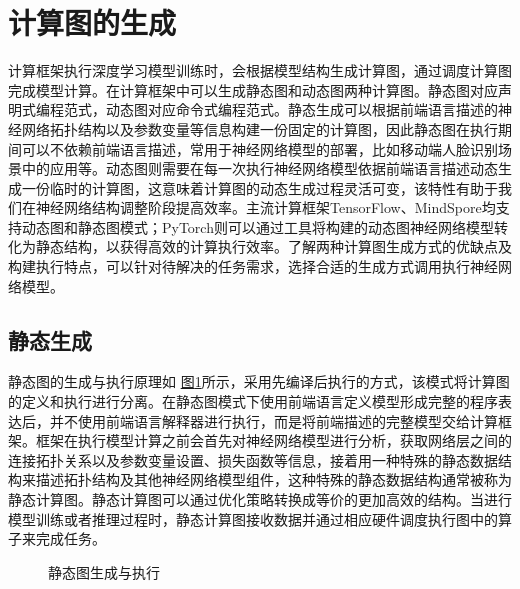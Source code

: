 \documentclass[letterpaper,10pt,english]{sphinxmanual}
\let\sphinxpxdimen\pdfpxdimen\else\newdimen\sphinxpxdimen
\begin{document}
\section{计算图的生成}
\label{\detokenize{chapter_computational_graph/generation_of_computational_graph:id1}}\label{\detokenize{chapter_computational_graph/generation_of_computational_graph::doc}}
\sphinxAtStartPar
计算框架执行深度学习模型训练时，会根据模型结构生成计算图，通过调度计算图完成模型计算。在计算框架中可以生成静态图和动态图两种计算图。静态图对应声明式编程范式，动态图对应命令式编程范式。静态生成可以根据前端语言描述的神经网络拓扑结构以及参数变量等信息构建一份固定的计算图，因此静态图在执行期间可以不依赖前端语言描述，常用于神经网络模型的部署，比如移动端人脸识别场景中的应用等。动态图则需要在每一次执行神经网络模型依据前端语言描述动态生成一份临时的计算图，这意味着计算图的动态生成过程灵活可变，该特性有助于我们在神经网络结构调整阶段提高效率。主流计算框架TensorFlow、MindSpore均支持动态图和静态图模式；PyTorch则可以通过工具将构建的动态图神经网络模型转化为静态结构，以获得高效的计算执行效率。了解两种计算图生成方式的优缺点及构建执行特点，可以针对待解决的任务需求，选择合适的生成方式调用执行神经网络模型。


\subsection{静态生成}
\label{\detokenize{chapter_computational_graph/generation_of_computational_graph:id2}}
\sphinxAtStartPar
静态图的生成与执行原理如
\hyperref[\detokenize{chapter_computational_graph/generation_of_computational_graph:static}]{图\ref{\detokenize{chapter_computational_graph/generation_of_computational_graph:static}}}所示，采用先编译后执行的方式，该模式将计算图的定义和执行进行分离。在静态图模式下使用前端语言定义模型形成完整的程序表达后，并不使用前端语言解释器进行执行，而是将前端描述的完整模型交给计算框架。框架在执行模型计算之前会首先对神经网络模型进行分析，获取网络层之间的连接拓扑关系以及参数变量设置、损失函数等信息，接着用一种特殊的静态数据结构来描述拓扑结构及其他神经网络模型组件，这种特殊的静态数据结构通常被称为静态计算图。静态计算图可以通过优化策略转换成等价的更加高效的结构。当进行模型训练或者推理过程时，静态计算图接收数据并通过相应硬件调度执行图中的算子来完成任务。

\begin{figure}[H]
\centering
\capstart

\noindent\sphinxincludegraphics[width=800\sphinxpxdimen]{{static}.svg}
\caption{静态图生成与执行}\label{\detokenize{chapter_computational_graph/generation_of_computational_graph:id6}}\label{\detokenize{chapter_computational_graph/generation_of_computational_graph:static}}\end{figure}
\end{document}
